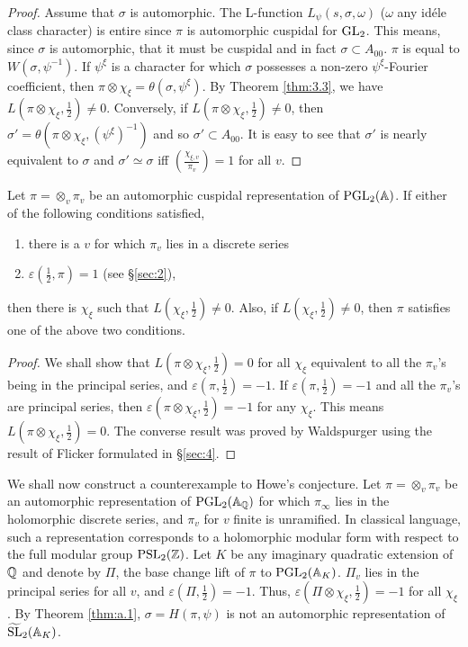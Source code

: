 \begin{appendices}
\begin{proof}
Assume that $\sigma$ is automorphic.
The L-function $L_\psi(s, \sigma,\omega)$ ($\omega$ any id\'ele class character) is entire since $\pi$ is automorphic cuspidal for $\mathrm{GL}_2$.
This means, since $\sigma$ is automorphic, that it must be cuspidal and in fact $\sigma \subset A_{00}$.
$\pi$ is equal to $W(\sigma, \psi^{-1})$.
If $\psi^\xi$ is a character for which $\sigma$ possesses a non-zero $\psi^\xi$-Fourier coefficient, then $\pi \otimes \chi_\xi = \theta(\sigma, \psi^\xi)$.
By Theorem \ref{thm:3.3}, we have $L(\pi \otimes \chi_\xi, \frac{1}{2}) \neq 0$.
Conversely, if $L(\pi \otimes \chi_\xi, \frac{1}{2}) \neq 0$, then $\sigma' = \theta(\pi \otimes \chi_\xi, (\psi^\xi)^{-1})$ and so $\sigma' \subset A_{00}$.
It is easy to see that $\sigma'$ is nearly equivalent to $\sigma$ and $\sigma' \simeq \sigma$ iff $\left(\frac{\chi_{\xi, v}}{\pi_v}\right) = 1$ for all $v$.
\end{proof}

\begin{theorem}
\label{thm:a.2}
Let $\pi = \otimes_v \pi_v$ be an automorphic cuspidal representation of $\mathrm{PGL}_2(\mathbb{A})$.
If either of the following conditions satisfied,
\begin{enumerate}[label=\roman*)]
    \item there is a $v$ for which $\pi_v$ lies in a discrete series
    \item $\varepsilon(\frac{1}{2}, \pi) = 1$ (see \S \ref{sec:2}),
\end{enumerate}
then there is $\chi_\xi$ such that $L(\chi_\xi, \frac{1}{2}) \neq 0$.
Also, if $L(\chi_\xi, \frac{1}{2}) \neq 0$, then $\pi$ satisfies one of the above two conditions.
\end{theorem}
\begin{proof}
We shall show that $L( \pi \otimes \chi_\xi,\frac{1}{2}) = 0$ for all $\chi_\xi$ equivalent to all the $\pi_v$'s being in the principal series, and $\varepsilon(\pi, \frac{1}{2}) = -1$.
If $\varepsilon(\pi, \frac{1}{2}) = -1$ and all the $\pi_v$'s are principal series, then $\varepsilon(\pi \otimes \chi_\xi, \frac{1}{2}) = -1$ for any $\chi_\xi$.
This means $L(\pi \otimes \chi_\xi, \frac{1}{2}) = 0$.
The converse result was proved by Waldspurger using the result of Flicker \cite{flicker80covering} formulated in \S \ref{sec:4}.
\end{proof}

We shall now construct a counterexample to Howe's conjecture.
Let $\pi = \otimes_v \pi_v$ be an automorphic representation of $\mathrm{PGL}_2(\mathbb{A}_{\mathbb{Q}})$ for which $\pi_\infty$ lies in the holomorphic discrete series, and $\pi_v$ for $v$ finite is unramified.
In classical language, such a representation corresponds to a holomorphic modular form with respect to the full modular group $\mathrm{PSL}_2(\mathbb{Z})$.
Let $K$ be any imaginary quadratic extension of $\mathbb{Q}$ and denote by $\Pi$, the base change lift of $\pi$ to $\mathrm{PGL}_2(\mathbb{A}_K)$.
$\Pi_v$ lies in the principal series for all $v$, and $\varepsilon(\Pi, \frac{1}{2}) = -1$.
Thus, $\varepsilon(\Pi \otimes \chi_\xi, \frac{1}{2}) =-1$ for all $\chi_\xi$.
By Theorem \ref{thm:a.1}, $\sigma = H(\pi, \psi)$ is not an automorphic representation of $\widetilde{\mathrm{SL}}_2(\mathbb{A}_K)$.



\end{appendices}
